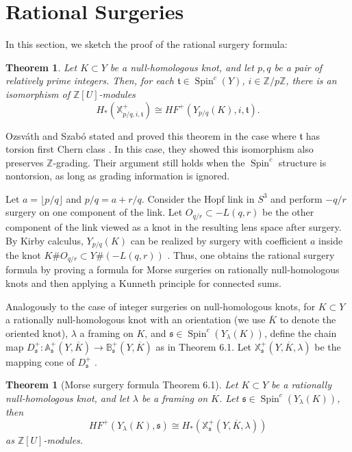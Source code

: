 \documentclass{article}
\newtheorem{theorem}[equation]{Theorem}
\theoremstyle{remark}
\numberwithin{equation}{section}
\numberwithin{table}{section}
\renewcommand{\frak}{\mathfrak}
\DeclareMathOperator{\Spin}{Spin}
\renewcommand{\(}{\left(}
\renewcommand{\)}{\right)}
\newcommand{\Z}{{\mathbb{Z}}}
\newcommand{\A}{{\mathbb{A}}}
\newcommand{\B}{{\mathbb{B}}}
\newcommand{\X}{{\mathbb{X}}}
\begin{document}
\section{Rational Surgeries}




In this section, we sketch the proof of the rational surgery formula:

\begin{theorem}\label{thm:rational-surgery-formula}
Let $K\subset Y$ be a null-homologous knot, and let $p,q$ be a pair of relatively prime integers. Then, for each $\frak t\in\Spin^c(Y)$, $i\in\Z/p\Z$, there is an isomorphism of $\Z[U]$-modules
$$H_*(\mathbb X_{p/q,i,\frak t}^+)\cong HF^+(Y_{p/q}(K),i,\frak t).$$
\end{theorem}

Ozsv\'ath and Szab\'o stated and proved this theorem in the case where $\frak t$ has torsion first Chern class \cite{oz-sz-rational}. In this case, they showed this isomorphism also preserves $\Z$-grading. Their argument still holds when the $\Spin^c$ structure is nontorsion, as long as grading information is ignored.

Let $a=\lfloor p/q\rfloor$ and $p/q=a+r/q$. Consider the Hopf link in $S^3$ and perform $-q/r$ surgery on one component of the link. Let $O_{q/r}\subset -L(q,r)$ be the other component of the link viewed as a knot in the resulting lens space after surgery. By Kirby calculus, $Y_{p/q}(K)$ can be realized by surgery with coefficient $a$ inside the knot $K\#O_{q/r}\subset Y\#(-L(q,r))$ \cite{oz-sz-rational}. Thus, one obtains the rational surgery formula by proving a formula for Morse surgeries on rationally null-homologous knots and then applying a Kunneth principle for connected sums.

Analogously to the case of integer surgeries on null-homologous knots, for $K\subset Y$ a rationally null-homologous knot with an orientation (we use $\overline K$ to denote the oriented knot), $\lambda$ a framing on $K$, and $\frak s\in\Spin^c(Y_\lambda(K))$, define the chain map $D_{\frak s}^+:\A_{\frak s}^+(Y,\overline{K})\to\B_{\frak s}^+(Y,\overline{K})$ as in \cite{oz-sz-rational} Theorem 6.1. Let $\X_{\frak s}^+(Y,\overline{K},\lambda)$ be the mapping cone of $D_{\frak s}^+$ \cite{oz-sz-rational}.

\begin{theorem}[Morse surgery formula \cite{oz-sz-rational} Theorem 6.1]
Let $K\subset Y$ be a rationally null-homologous knot, and let $\lambda$ be a framing on $K$. Let $\frak s\in\Spin^c(Y_\lambda(K))$, then
$$HF^+(Y_\lambda(K),\frak s)\cong H_*(\X_{\frak s}^+(Y,\overline{K},\lambda))$$ as $\Z[U]$-modules. 
\end{theorem}
\end{document}
